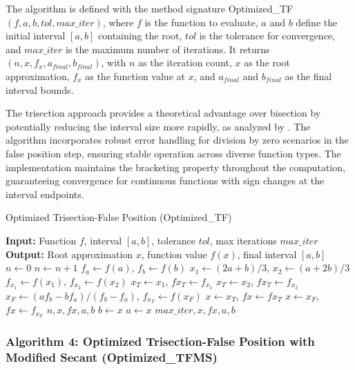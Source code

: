 \documentclass[amsmath, amssymb, aps]{revtex4-2}
\begin{document}
The algorithm is defined with the method signature Optimized\_TF$(f, a, b, tol, max\_iter)$, where $f$ is the function to evaluate, $a$ and $b$ define the initial interval $[a, b]$ containing the root, $tol$ is the tolerance for convergence, and $max\_iter$ is the maximum number of iterations. It returns $(n, x, f_x, a_{final}, b_{final})$, with $n$ as the iteration count, $x$ as the root approximation, $f_x$ as the function value at $x$, and $a_{final}$ and $b_{final}$ as the final interval bounds.

The trisection approach provides a theoretical advantage over bisection by potentially reducing the interval size more rapidly, as analyzed by \cite{demir2008trisection}. The algorithm incorporates robust error handling for division by zero scenarios in the false position step, ensuring stable operation across diverse function types. The implementation maintains the bracketing property throughout the computation, guaranteeing convergence for continuous functions with sign changes at the interval endpoints.

\begin{algorithm}[H]
\caption{Optimized Trisection-False Position (Optimized\_TF)}
\begin{algorithmic}[1]
\State \textbf{Input:} Function $f$, interval $[a, b]$, tolerance $tol$, max iterations $max\_iter$
\State \textbf{Output:} Root approximation $x$, function value $f(x)$, final interval $[a, b]$
\State $n \gets 0$
    \State $n \gets n + 1$
    \State $f_a \gets f(a)$, $f_b \gets f(b)$
    \State $x_1 \gets (2a + b)/3$, $x_2 \gets (a + 2b)/3$
    \State $f_{x_1} \gets f(x_1)$, $f_{x_2} \gets f(x_2)$
        \State $x_T \gets x_1$, $fx_T \gets f_{x_1}$
    \Else
        \State $x_T \gets x_2$, $fx_T \gets f_{x_2}$
    \EndIf
    \State $x_F \gets (a f_b - b f_a)/(f_b - f_a)$, $f_{x_F} \gets f(x_F)$
        \State $x \gets x_T$, $fx \gets fx_T$
    \Else
        \State $x \gets x_F$, $fx \gets f_{x_F}$
    \EndIf
        \State \Return $n, x, fx, a, b$
    \EndIf
        \State $b \gets x$
    \Else
        \State $a \gets x$
    \EndIf
\EndWhile
\State \Return $max\_iter, x, fx, a, b$
\end{algorithmic}
\end{algorithm}

\subsubsection{Algorithm 4: Optimized Trisection-False Position with Modified Secant (Optimized\_TFMS)}
\end{document}
